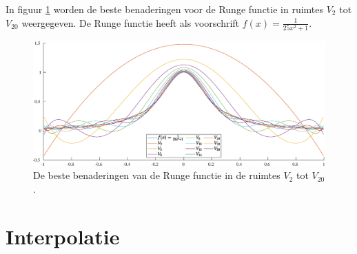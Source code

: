 \documentclass[a4paper, 12pt, titlepage, fleqn]{article}
\begin{document}
In figuur \ref{fig:rungeFunctie} worden de beste benaderingen voor de Runge functie in ruimtes $V_2$ tot $V_{20}$ weergegeven. De Runge functie heeft als voorschrift $f(x) = \frac{1}{25x^2+1}$.
\begin{figure}
\centering
\includegraphics[scale=0.5]{../Afbeeldingen/rungeBenadering.eps}
\caption{De beste benaderingen van de Runge functie in de ruimtes $V_2$ tot $V_{20}$.
\label{fig:rungeFunctie}}
\end{figure}

\section{Interpolatie}
\label{sec:interpolatie}
\end{document}
